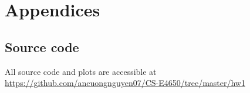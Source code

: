 \section{Appendices}

\subsection{Source code}
All source code and plots are accessible at \url{https://github.com/ancuongnguyen07/CS-E4650/tree/master/hw1}